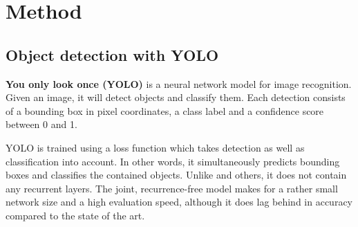 \section{Method}
\label{sec:method}

\subsection{Object detection with YOLO}

\textbf{You only look once (YOLO)} \citep{RedmonYouOnlyLook2015} is a neural network model for image recognition.
Given an image, it will detect objects and classify them.
Each detection consists of a bounding box in pixel coordinates, a class label and a confidence score between 0 and 1.

YOLO is trained using a loss function which takes detection as well as classification into account.
In other words, it simultaneously predicts bounding boxes and classifies the contained objects.
Unlike \cite{HeMaskRCNN2017} and others, it does not contain any recurrent layers.
The joint, recurrence-free model makes for a rather small network size and a high evaluation speed, although it does lag behind in accuracy compared to the state of the art.

